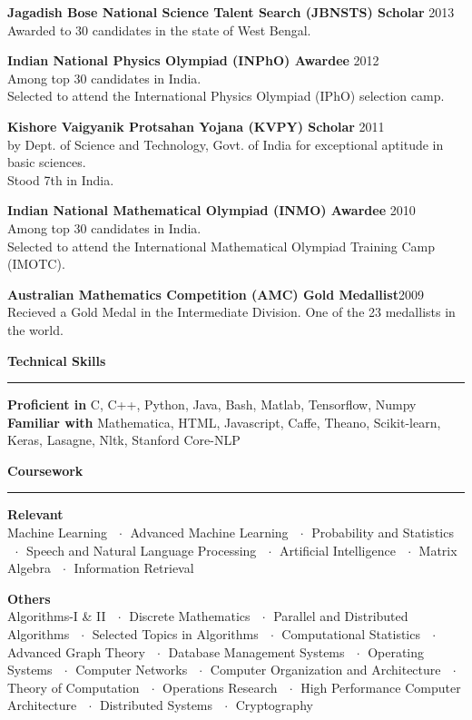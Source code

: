 \documentclass[10pt]{article}
\newcommand{\heading}[1]{
 {\large \textbf{#1}}
  \vspace{0.4em}
  \hrule
  \vspace{0.4em}
}
\newcommand{\EntryGap}{\vspace{0.5cm}}
\newcommand{\SmallEntryGap}{\vspace{0.2cm}}
\newcommand{\mdot}{$\ \ \cdot\ \ $}
\begin{document}
 \textbf{Jagadish Bose National Science Talent Search (JBNSTS) Scholar} \hfill 2013\\
  Awarded to 30 candidates in the state of West Bengal.
  \SmallEntryGap
  
 \textbf{Indian National Physics Olympiad (INPhO) Awardee} \hfill 2012\\
  Among top 30 candidates in India.\\
  Selected to attend the 
  International Physics Olympiad (IPhO) selection camp.
  \SmallEntryGap
  
 \textbf{Kishore Vaigyanik Protsahan Yojana (KVPY) Scholar} \hfill 2011\\
  by Dept. of Science and Technology, Govt. of India for exceptional aptitude in basic sciences.\\
  Stood 7th in India.
  \SmallEntryGap
  
 \textbf{Indian National Mathematical Olympiad (INMO) Awardee} \hfill 2010\\
  Among top 30 candidates in India.\\
  Selected to attend the International Mathematical Olympiad Training Camp (IMOTC).
  \SmallEntryGap
  
 \textbf{Australian Mathematics Competition (AMC) Gold Medallist}\hfill 2009\\
  Recieved a Gold Medal in the Intermediate Division. One of the 23 medallists in the world.




\EntryGap
\heading{Technical Skills}
\SmallEntryGap
\textbf{Proficient in} C, C++, Python, Java, Bash, Matlab, Tensorflow, Numpy\\
\textbf{Familiar with} Mathematica, HTML, Javascript, Caffe, Theano, Scikit-learn,\\
Keras, Lasagne, Nltk, Stanford Core-NLP





\EntryGap
\heading{Coursework}
\SmallEntryGap
\textbf{Relevant}\\
Machine Learning \mdot Advanced Machine Learning \mdot Probability and Statistics \mdot Speech and Natural Language Processing 
\mdot Artificial Intelligence \mdot Matrix Algebra \mdot Information Retrieval

\SmallEntryGap
\textbf{Others}\\
Algorithms-I \& II \mdot Discrete Mathematics \mdot Parallel and Distributed Algorithms 
\mdot Selected Topics in Algorithms  \mdot Computational Statistics
\mdot Advanced Graph Theory \mdot Database Management Systems \mdot Operating Systems
\mdot Computer Networks \mdot Computer Organization and Architecture \mdot Theory of Computation
\mdot Operations Research \mdot High Performance Computer Architecture \mdot Distributed Systems
\mdot Cryptography
\end{document}
